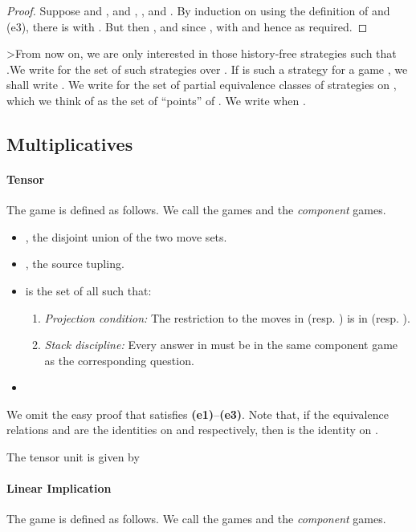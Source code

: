 \documentclass[11pt]{article}
\begin{document}
\begin{proof}  Suppose  and , and , , 
and . By induction on  using the definition of
 and (e3), there is  with
. But then , and since ,  with  and hence
 as required.
\end{proof}

>From now on, we are only interested in those history-free
strategies  such that .We write  for the set of such strategies over . If  is
such a strategy for a game , we shall write . We
write  for the set of partial equivalence classes of
strategies on  , which we think of as the set of ``points'' of
. We write  when
.

\subsection{Multiplicatives}
\paragraph{Tensor}

The game  is defined as follows.   We call the games 
and  the {\sl component} games.

\begin{itemize}
\item , the disjoint union of the two move
sets.
\item , the source tupling.
\item  is the set of all 
such that:
\begin{enumerate}
\item {\em Projection condition:} The restriction to the moves in  (resp. ) is in
 (resp. ).
\item {\em Stack discipline:} Every answer in  must be in the same component game as the
  corresponding question.
\end{enumerate}

\item 
\end{itemize}
We omit the easy proof that  satisfies
{\bf (e1)}--{\bf (e3)}.
Note that, if the equivalence relations  and  are
the identities on  and  respectively, then 
is the identity on .

The tensor unit is given by


\paragraph{Linear Implication}
The game  is defined as follows.   We call the games 
and  the {\sl component} games.
\end{document}
